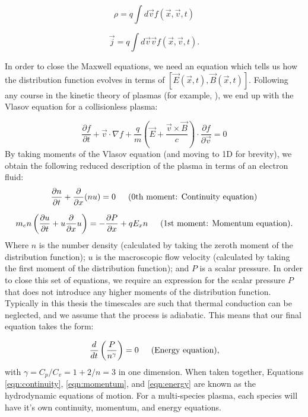 \begin{equation}
\rho= q \int d \vec{v} f(\vec{x},\vec{v},t)
\end{equation}

\begin{equation}
\vec{j} = q \int d \vec{v} \vec{v} f(\vec{x},\vec{v},t).
\end{equation}

In order to close the Maxwell equations, we need an equation which tells us how the distribution function evolves in terms of $[\vec{E}(\vec{x},t),\vec{B}(\vec{x},t)]$. Following any course in the kinetic theory of plasmas (for example, \citet{MMathPhys}), we end up with the Vlasov equation for a collisionless plasma:

\begin{equation}
 	\frac{\partial f}{\partial t}+\vec{v} \cdot {\nabla} f+\frac{q}{m}\left(\vec{E}+\frac{\vec{v} \times \vec{B}}{c}\right) \cdot \frac{\partial f}{\partial \vec{v}}=0
\end{equation} By taking moments of the Vlasov equation (and moving to 1D for brevity), we obtain the following reduced description of the plasma in terms of an electron fluid: 
\begin{equation}
\frac{\partial n}{\partial t}+\frac{\partial}{\partial x}(n u)=0 \text{\,\,\,\,\,\,\,\,\,(0th moment: Continuity equation)}
\label{eqn:continuity}
\end{equation}

\begin{equation}
m_e n \left(\frac{\partial u}{\partial t} + u\frac{\partial}{\partial x}u\right)=-\frac{\partial P}{\partial x}+q E_{x} n \text{\,\,\,\,\,\,\,\,\,(1st moment: Momentum equation)}.
\label{eqn:momentum}
\end{equation} Where $n$ is the number density (calculated by taking the zeroth moment of the distribution function); $u$ is the macroscopic flow velocity (calculated by taking the first moment of the distribution function); and $P$ is a scalar pressure. In order to close this set of equations, we require an expression for the scalar pressure $P$ that does not introduce any higher moments of the distribution function. Typically in this thesis the timescales are such that thermal conduction can be neglected, and we assume that the process is adiabatic. This means that our final equation takes the form:

\begin{equation}
\frac{d}{dt}\left(\frac{P}{n^{\gamma}}\right) = 0 \text{\,\,\,\,\,\,\,\,\,(Energy equation)},
\label{eqn:energy}
\end{equation} with $\gamma = C_p/C_v = 1 + 2/n = 3$ in one dimension. When taken together, Equations \ref{eqn:continuity}, \ref{eqn:momentum}, and \ref{eqn:energy} are known as the hydrodynamic equations of motion. For a multi-species plasma, each species will have it's own continuity, momentum, and energy equations.

